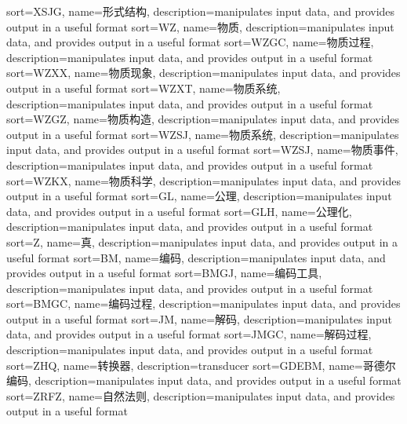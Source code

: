 {
  sort=XSJG,
  name=形式结构,
  description={manipulates input data, and provides output in a useful format}
}
{
  sort=WZ,
  name=物质,
  description={manipulates input data, and provides output in a useful format}
}
{
  sort=WZGC,
  name=物质过程,
  description={manipulates input data, and provides output in a useful format}
}
{
  sort=WZXX,
  name=物质现象,
  description={manipulates input data, and provides output in a useful format}
}
{
  sort=WZXT,
  name=物质系统,
  description={manipulates input data, and provides output in a useful format}
}
{
  sort=WZGZ,
  name=物质构造,
  description={manipulates input data, and provides output in a useful format}
}
{
  sort=WZSJ,
  name=物质系统,
  description={manipulates input data, and provides output in a useful format}
}
{
  sort=WZSJ,
  name=物质事件,
  description={manipulates input data, and provides output in a useful format}
}
{
  sort=WZKX,
  name=物质科学,
  description={manipulates input data, and provides output in a useful format}
}
{
  sort=GL,
  name=公理,
  description={manipulates input data, and provides output in a useful format}
}
{
  sort=GLH,
  name=公理化,
  description={manipulates input data, and provides output in a useful format}
}
{
  sort=Z,
  name=真,
  description={manipulates input data, and provides output in a useful format}
}
{
  sort=BM,
  name=编码,
  description={manipulates input data, and provides output in a useful format}
}
{
  sort=BMGJ,
  name=编码工具,
  description={manipulates input data, and provides output in a useful format}
}
{
  sort=BMGC,
  name=编码过程,
  description={manipulates input data, and provides output in a useful format}
}
{
  sort=JM,
  name=解码,
  description={manipulates input data, and provides output in a useful format}
}
{
  sort=JMGC,
  name=解码过程,
  description={manipulates input data, and provides output in a useful format}
}
{
  sort=ZHQ,
  name=转换器,
  description={transducer}
}
{
  sort=GDEBM,
  name=哥德尔编码,
  description={manipulates input data, and provides output in a useful format}
}
{
  sort=ZRFZ,
  name=自然法则,
  description={manipulates input data, and provides output in a useful format}
}
